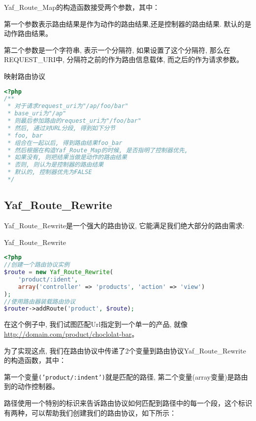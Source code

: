Yaf\_Route\_Map的构造函数接受两个参数，其中：

第一个参数表示路由结果是作为动作的路由结果,还是控制器的路由结果. 默认的是动作路由结果。

第二个参数是一个字符串, 表示一个分隔符, 如果设置了这个分隔符, 那么在REQUEST\_URI中, 分隔符之前的作为路由信息载体, 而之后的作为请求参数。

\begin{example}
映射路由协议
\begin{lstlisting}[language=PHP]
<?php
/**
 * 对于请求request_uri为"/ap/foo/bar"
 * base_uri为"/ap"
 * 则最后参加路由的request_uri为"/foo/bar"
 * 然后, 通过对URL分段, 得到如下分节
 * foo, bar
 * 组合在一起以后, 得到路由结果foo_bar
 * 然后根据在构造Yaf_Route_Map的时候, 是否指明了控制器优先,
 * 如果没有, 则把结果当做是动作的路由结果
 * 否则, 则认为是控制器的路由结果
 * 默认的, 控制器优先为FALSE
 */
\end{lstlisting}
\end{example}


\subsection{Yaf\_Route\_Rewrite}

Yaf\_Route\_Rewrite是一个强大的路由协议, 它能满足我们绝大部分的路由需求:




\begin{example}
Yaf\_Route\_Rewrite
\begin{lstlisting}[language=PHP]
<?php
//创建一个路由协议实例
$route = new Yaf_Route_Rewrite(
    'product/:ident', 
    array('controller' => 'products', 'action' => 'view')
);
//使用路由器装载路由协议
$router->addRoute('product', $route);
\end{lstlisting}
\end{example}

在这个例子中, 我们试图匹配Url指定到一个单一的产品, 就像\url{http://domain.com/product/choclolat-bar}。

为了实现这点, 我们在路由协议中传递了2个变量到路由协议Yaf\_Route\_Rewrite的构造函数，其中：

第一个变量\texttt{('product/:indent')}就是匹配的路径, 第二个变量(array变量)是路由到的动作控制器。

路径使用一个特别的标识来告诉路由协议如何匹配到路径中的每一个段，这个标识有两种，可以帮助我们创建我们的路由协议，如下所示：

